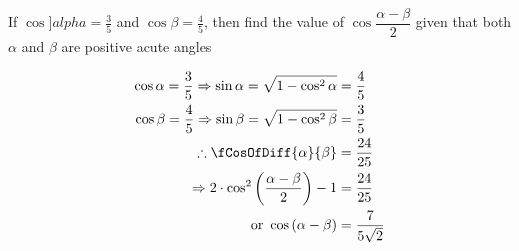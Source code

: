 
%
%
%
%
% 
% 
\question If $\cos]alpha = \frac{3}{5}$ and $\cos\beta = \frac{4}{5}$, then find the 
value of $\cos\dfrac{\alpha-\beta}{2}$ given that both $\alpha$ and $\beta$ are positive
acute angles

\insertQR[-20pt]{}

\ifprintanswers
\fi 

\begin{solution}
	\begin{align}
	   \cos\alpha = \dfrac{3}{5} \Rightarrow \sin\alpha = \sqrt{1-\cos^2\alpha} &= \dfrac{4}{5} \\
	   \cos\beta = \dfrac{4}{5} \Rightarrow \sin\beta = \sqrt{1-\cos^2\beta} &= \dfrac{3}{5} \\
	   \therefore \fCosOfDiff{\alpha}{\beta} &= \dfrac{24}{25} \\
	   \Rightarrow 2\cdot\cos^2\left( \dfrac{\alpha-\beta}{2}\right) - 1 &= \dfrac{24}{25} \\
	   \text{ or } \cos\left(\alpha-\beta \right) &= \dfrac{7}{5\sqrt2}
	\end{align}
\end{solution}
